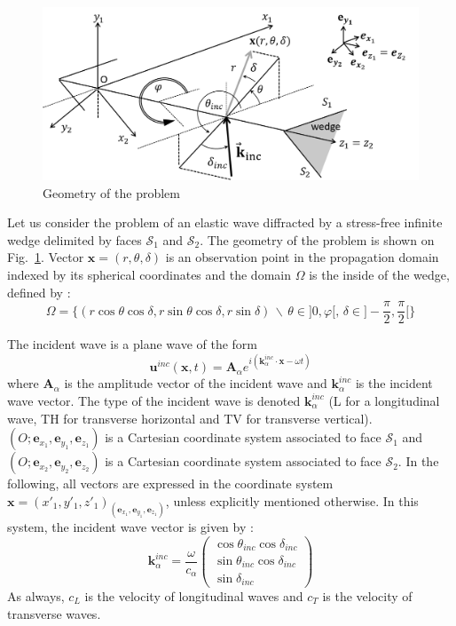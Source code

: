 \begin{figure}[h]
\centering
	\includegraphics[width=\textwidth]{images/chapter4/wedge_3D.png}
\caption{Geometry of the problem}
\label{diedre_coords}
\end{figure}

Let us consider the problem of an elastic wave diffracted by a stress-free infinite wedge delimited by faces $\mathcal{S}_1$ and $\mathcal{S}_2$. The geometry of the problem is shown on Fig.~\ref{diedre_coords}. Vector $\mathbf{x}=(r,\theta,\delta)$ is an observation point in the propagation domain indexed by its spherical coordinates and the domain $\Omega$ is the inside of the wedge, defined by :
\begin{equation}
\Omega=\{ (r\cos \theta \cos \delta, r \sin \theta \cos \delta, r \sin \delta)\, \backslash \, \theta \in \rbrack 0, \varphi \lbrack, \, \delta \in \rbrack -\frac{\pi}{2}, \frac{\pi}{2} \lbrack \}
\end{equation}

The incident wave is a plane wave of the form
\begin{equation}
\mathbf{u}^{inc}(\mathbf{x},t)=\mathbf{A}_{\alpha}e^{i(\mathbf{k}_{\alpha}^{inc}\cdot \mathbf{x}-\omega t)}
\end{equation}
where $\mathbf{A}_{\alpha}$ is the amplitude vector of the incident wave and $\mathbf{k}_{\alpha}^{inc}$ is the incident wave vector. The type of the incident wave is denoted $\mathbf{k}_{\alpha}^{inc}$ (L for a longitudinal wave, TH for transverse horizontal and TV for transverse vertical). $(O; \mathbf{e}_{x_1}, \mathbf{e}_{y_1}, \mathbf{e}_{z_1})$ is a Cartesian coordinate system associated to face $\mathcal{S}_1$ and $(O; \mathbf{e}_{x_2}, \mathbf{e}_{y_2}, \mathbf{e}_{z_2})$ is a Cartesian coordinate system associated to face $\mathcal{S}_2$. In the following, all vectors are expressed in the coordinate system $\mathbf{x}=(x'_1,y'_1,z'_1)_{(\mathbf{e}_{x_1}, \mathbf{e}_{y_1}, \mathbf{e}_{z_1})}$, unless explicitly mentioned otherwise. In this system, the incident wave vector is given by :
\begin{equation}
\mathbf{k}_{\alpha}^{inc}=\frac{\omega}{c_{\alpha}} \begin{pmatrix}
\cos\theta_{inc} \cos \delta_{inc} \\ \sin\theta_{inc} \cos \delta_{inc} \\
\sin \delta_{inc}
\end{pmatrix}
\end{equation}
As always, $c_L$ is the velocity of longitudinal waves and $c_T$ is the velocity of transverse waves.

